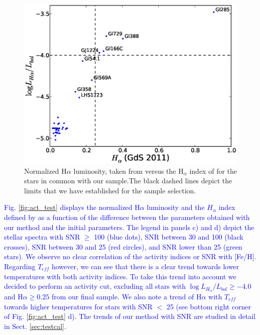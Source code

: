 \documentclass{aa}
\begin{document}
\begin{figure}[]
\centering
\includegraphics[scale=0.45]{pics/activity.eps}
\caption{Normalized H$\alpha$ luminosity, taken from \citet{Reiners-2012} versus the H$_{\alpha}$ index of \citet{Gomes_da_Silva-2011} for the stars in common with our sample.The black dashed lines depict the limits that we have established for the sample selection.}
\label{fig:activity}
\end{figure}

\textcolor{blue}{Fig. \ref{fig:act_test} displays the normalized H$\alpha$ luminosity and the $H_{\alpha}$ index defined by \citet{Gomes_da_Silva-2011}  as a function of the difference between the parameters obtained with our method and the initial parameters. The legend in panels c) and d) depict the stellar spectra with SNR $\geq$ 100 (blue dots), SNR between 30 and 100 (black crosses), SNR between 30 and 25 (red circles), and SNR lower than 25 (green stars). We observe no clear correlation of the activity indices or SNR with [Fe/H]. Regarding $T_{eff}$ however, we can see that there is a clear trend towards lower temperatures with both activity indices. To take this trend into account we decided to perform an activity cut, excluding all stars with $\log{L_{H_{\alpha}}/L_{bol}} \geq -4.0 $ and H$\alpha \geq 0.25$ from our final sample. We also note a trend of H$\alpha$ with $T_{eff}$ towards higher temperatures for stars with SNR $<$ 25 (see bottom right corner of Fig. \ref{fig:act_test} d). The trends of our method with SNR are studied in detail in Sect. \ref{sec:testcal}. 
}
\end{document}
